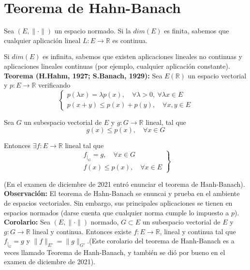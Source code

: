 \documentclass{article}
\begin{document}
\section{Teorema de Hahn-Banach}
Sea $(E,\|\cdot\|)$ un espacio normado. Si la $dim(E)$ es finita, sabemos que cualquier aplicación lineal $L:E\rightarrow \mathbb{R}$ es continua. 

Si $dim(E)$ es infinita, sabemos que existen aplicaciones lineales no continuas y aplicaciones lineales continuas (por ejemplo, cualquier aplicación constante).\\

\textbf{Teorema (H.Hahm, 1927; S.Banach, 1929):} Sea $E(\mathbb{R})$ un espacio vectorial y $p:E\rightarrow \mathbb{R}$ verificando
\begin{equation*}
\left\lbrace\begin{array}{c}
p(\lambda x)=\lambda p(x),\quad \forall \lambda > 0,\:\forall \lambda x\in E\\
p(x+y)\leq p(x)+p(y),\quad \forall x,y\in E
\end{array}\right.
\end{equation*}

Sea $G$ un subespacio vectorial de $E$ y $g:G\rightarrow \mathbb{R}$ lineal, tal que
\begin{equation*}
g(x)\leq p(x),\quad \forall x\in G
\end{equation*}

Entonces $\exists f:E\rightarrow \mathbb{R}$ lineal tal que
\begin{equation*}
\left.\begin{array}{c}
f_{|_G}=g,\quad \forall x\in G\\
f(x)\leq p(x),\quad \forall x\in E
\end{array}\right\rbrace
\end{equation*}

(En el examen de diciembre de 2021 entró enunciar el teorema de Hanh-Banach).\\

\textbf{Observación:} El teorema de Hahn-Banach se enuncai y prueba en el ambiente de espacios vectoriales. Sin embargo, sus principales aplicaciones se tienen en espacios normados (darse cuenta que cualquier norma cumple lo impuesto a $p$).\\

\textbf{Corolario:} Sea $(E,\|\cdot\|)$ normado, $G\subset E$ un subespacio vectorial de $E$ y $g:G\rightarrow \mathbb{R}$ lineal y continua. Entonces existe $f:E\rightarrow \mathbb{R}$, lineal y continua tal que $f_{|_G}=g$ y $\|f\|_{E'}=\|g\|_{G'}$.(Este corolario del teorema de Hanh-Banach es a veces llamado Teorema de Hanh-Banach, y también se dió por bueno en el examen de diciembre de 2021).\\
\end{document}
